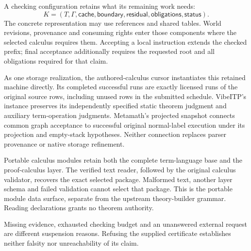 \documentclass[11pt,a4paper]{article}
\newcommand{\diagramcaption}[1]{\par{\small\color{ink}#1\par}\medskip}
\begin{document}
A checking configuration retains what its remaining work needs:
\[
 K=(T,\Gamma,\mathsf{cache},\mathsf{boundary},
       \mathsf{residual},\mathsf{obligations},\mathsf{status}).
\]
The concrete representation may use references and shared tables. World
revisions, provenance and consuming rights enter those components where the
selected calculus requires them. Accepting a local instruction extends the
checked prefix; final acceptance additionally requires the requested root and
all obligations required for that claim.

As one storage realization, the authored-calculus cursor instantiates this
retained machine directly.
Its completed successful runs are exactly licensed runs of the original
source rows, including unused rows in the submitted schedule. VibeITP's
instance preserves its independently specified static theorem judgment and
auxiliary term-operation judgments. Metamath's projected snapshot connects
common graph acceptance to successful original normal-label execution under
its projection and empty-stack hypotheses. Neither connection replaces
parser provenance or native storage refinement.

Portable calculus modules retain both the complete term-language base and
the proof-calculus layer. The verified text reader, followed by the original
calculus validator, recovers the exact selected package. Malformed text,
another layer schema and failed validation cannot select that package.
This is the portable module data surface, separate from the upstream
theory-builder grammar. Reading declarations grants no theorem authority.

\begin{center}
\end{center}
\diagramcaption{Missing evidence, exhausted checking budget and an unanswered
external request are different suspension reasons. Refusing the supplied
certificate establishes neither falsity nor unreachability of its claim.}
\end{document}
